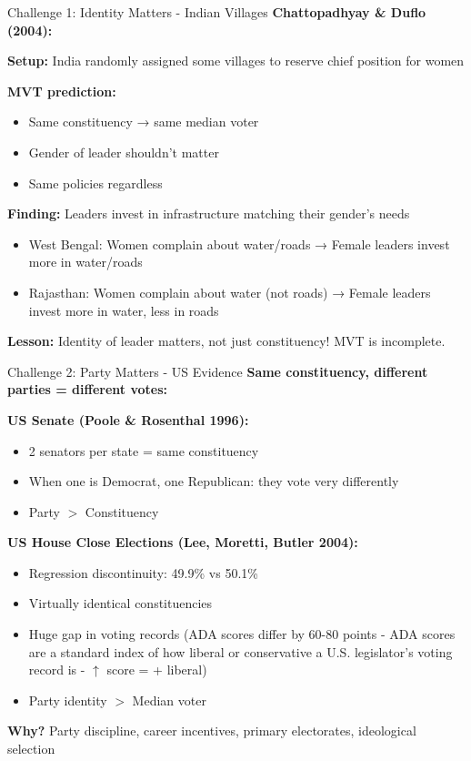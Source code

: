 \documentclass[10pt]{beamer}
\begin{document}
\begin{frame}{Challenge 1: Identity Matters - Indian Villages}
\textbf{Chattopadhyay \& Duflo (2004):}


\textbf{Setup:} India randomly assigned some villages to reserve chief position for women



\textbf{MVT prediction:}
\begin{itemize}
\item Same constituency → same median voter
\item Gender of leader shouldn't matter
\item Same policies regardless
\end{itemize}



\textbf{Finding:} \alert{Leaders invest in infrastructure matching their gender's needs}
\begin{itemize}
\item West Bengal: Women complain about water/roads → Female leaders invest more in water/roads
\item Rajasthan: Women complain about water (not roads) → Female leaders invest more in water, less in roads
\end{itemize}



\alert{\textbf{Lesson:}} Identity of leader matters, not just constituency! MVT is incomplete.
\end{frame}

\begin{frame}{Challenge 2: Party Matters - US Evidence}
\textbf{Same constituency, different parties = different votes:}



\textbf{US Senate (Poole \& Rosenthal 1996):}
\begin{itemize}
\item 2 senators per state = same constituency
\item When one is Democrat, one Republican: they vote very differently
\item Party $>$ Constituency
\end{itemize}



\textbf{US House Close Elections (Lee, Moretti, Butler 2004):}
\begin{itemize}
\item Regression discontinuity: 49.9\% vs 50.1\%
\item Virtually identical constituencies
\item \alert{Huge gap in voting records} (ADA scores differ by 60-80 points - ADA scores are a standard index of how liberal or conservative a U.S. legislator’s voting record is - $\uparrow$ score = + liberal)
\item Party identity $>$ Median voter
\end{itemize}



\alert{\textbf{Why?}} Party discipline, career incentives, primary electorates, ideological selection


\small{\hyperlink{evidence-against}{}}
\end{frame}
\end{document}
